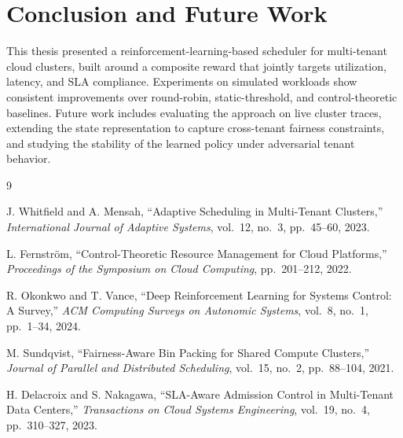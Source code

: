 \chapter{Conclusion and Future Work}

This thesis presented a reinforcement-learning-based scheduler for
multi-tenant cloud clusters, built around a composite reward that jointly
targets utilization, latency, and SLA compliance. Experiments on simulated
workloads show consistent improvements over round-robin, static-threshold,
and control-theoretic baselines. Future work includes evaluating the
approach on live cluster traces, extending the state representation to
capture cross-tenant fairness constraints, and studying the stability of
the learned policy under adversarial tenant behavior.

\begin{thebibliography}{9}

J. Whitfield and A. Mensah, ``Adaptive Scheduling in Multi-Tenant Clusters,''
\textit{International Journal of Adaptive Systems}, vol.\ 12, no.\ 3, pp.\ 45--60, 2023.

L. Fernström, ``Control-Theoretic Resource Management for Cloud Platforms,''
\textit{Proceedings of the Symposium on Cloud Computing}, pp.\ 201--212, 2022.

R. Okonkwo and T. Vance, ``Deep Reinforcement Learning for Systems Control: A Survey,''
\textit{ACM Computing Surveys on Autonomic Systems}, vol.\ 8, no.\ 1, pp.\ 1--34, 2024.

M. Sundqvist, ``Fairness-Aware Bin Packing for Shared Compute Clusters,''
\textit{Journal of Parallel and Distributed Scheduling}, vol.\ 15, no.\ 2, pp.\ 88--104, 2021.

H. Delacroix and S. Nakagawa, ``SLA-Aware Admission Control in Multi-Tenant Data Centers,''
\textit{Transactions on Cloud Systems Engineering}, vol.\ 19, no.\ 4, pp.\ 310--327, 2023.

\end{thebibliography}

\appendix
